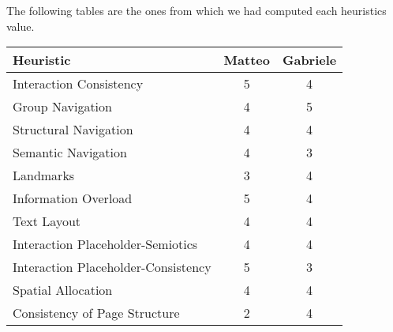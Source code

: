 The following tables are the ones from which we had computed each heuristics value.

\begin{table}[H]
  \begin{center}
    \begin{tabular}{|l|c|c|} %
          \hline

      \textbf{Heuristic} & \textbf{Matteo} & \textbf{Gabriele}\\
      
      \hline
      Interaction Consistency & 5 & 4\\
      \hline
      Group Navigation & 4 & 5\\
      \hline
      Structural Navigation & 4 & 4\\
      \hline
      Semantic Navigation & 4 & 3\\
      \hline
      Landmarks & 3 & 4\\
    \hline 
    \hline
    \hline

     Information Overload & 5 & 4\\
    \hline 
    \hline
    \hline
     Text Layout & 4 & 4\\
      \hline
      Interaction Placeholder-Semiotics & 4 & 4\\
      \hline
      Interaction Placeholder-Consistency & 5 & 3\\
      \hline
      Spatial Allocation & 4 & 4\\
      \hline
      Consistency of Page Structure & 2 & 4\\

\hline
    \end{tabular}
  \end{center}
\end{table}